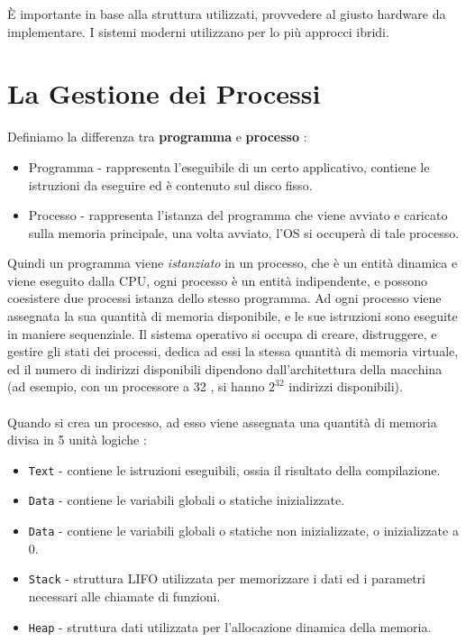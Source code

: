 \documentclass[12pt, letterpaper]{article}
\newcommand{\code}[1]{\colorbox{light-gray}{\texttt{#1}}}
\begin{document}
È importante in base alla struttura utilizzati, provvedere al giusto hardware da implementare. I sistemi 
moderni utilizzano per lo più approcci ibridi.\newpage
\section{La Gestione dei Processi}
Definiamo la differenza tra \textbf{programma} e \textbf{processo} :
\begin{itemize}
    \item Programma - rappresenta l'eseguibile di un certo applicativo, contiene le istruzioni da eseguire ed 
     è contenuto sul disco fisso. 
     \item Processo - rappresenta l'istanza del programma che viene avviato e caricato sulla memoria principale,
     una volta avviato, l'OS si occuperà di tale processo. 
\end{itemize}
Quindi un programma viene \textit{istanziato} in un processo, che è un entità dinamica e viene eseguito 
dalla CPU, ogni processo è un entità indipendente, e possono coesistere due processi istanza dello stesso
programma. Ad ogni processo viene assegnata la sua quantità di memoria disponibile, e le sue istruzioni sono 
eseguite in maniere sequenziale. Il sistema operativo si occupa di creare, distruggere, e gestire gli stati 
dei processi, dedica ad essi la stessa quantità di memoria virtuale, ed il numero di indirizzi disponibili dipendono 
dall'architettura della macchina (ad esempio, con un processore a 32 , si hanno \(2^32\) indirizzi disponibili).
\\\hphantom{.}\\
Quando si crea un processo, ad esso viene assegnata una quantità di memoria divisa in 5 unità logiche :
\begin{itemize}
    \item \code{Text} - contiene le istruzioni eseguibili, ossia il risultato della compilazione.
    \item \code{Data} - contiene le variabili globali o statiche inizializzate.
    \item \code{Data} - contiene le variabili globali o statiche non inizializzate, o inizializzate a 0.
    \item \code{Stack} - struttura LIFO utilizzata per memorizzare i dati ed i parametri necessari alle chiamate di funzioni.
    \item \code{Heap} - struttura dati utilizzata per l'allocazione dinamica della memoria.
\end{itemize}
\end{document}
